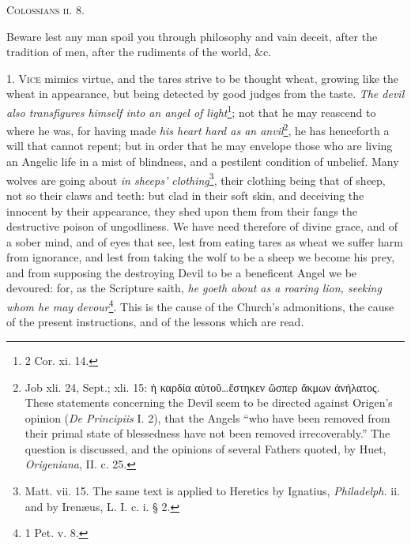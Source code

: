 \textsc{Colossians ii. 8}.

Beware lest any man spoil you through philosophy and vain deceit, after the tradition of men, after the rudiments of the world, \&c.

1. \textsc{Vice} mimics virtue, and the tares strive to be thought wheat, growing like the wheat in appearance, but being detected by good judges from the taste. \emph{The devil also transfigures himself into an angel of light}\footnote{2 Cor. xi. 14.}; not that he may reascend to where he was, for having made \emph{his heart hard as an anvil}\footnote{Job xli. 24, Sept.; xli. 15: \textgreek{ἡ καρδία αὐτοῦ…ἕστηκεν ὥσπερ ἄκμων ἀνήλατος}. These statements concerning the Devil seem to be directed against Origen’s opinion (\emph{De Principiis} I. 2), that the Angels “who have been removed from their primal state of blessedness have not been removed irrecoverably.” The question is discussed, and the opinions of several Fathers quoted, by Huet, \emph{Origeniana}, II. c. 25.}, he has henceforth a will that cannot repent; but in order that he may envelope those who are living an Angelic life in a mist of blindness, and a pestilent condition of unbelief. Many wolves are going about \emph{in sheeps’ clothing}\footnote{Matt. vii. 15. The same text is applied to Heretics by Ignatius, \emph{Philadelph.} ii. and by Irenæus, L. I. c. i. § 2.}, their clothing being that of sheep, not so their claws and teeth: but clad in their soft skin, and deceiving the innocent by their appearance, they shed upon them from their fangs the destructive poison of ungodliness. We have need therefore of divine grace, and of a sober mind, and of eyes that see, lest from eating tares as wheat we suffer harm from ignorance, and lest from taking the wolf to be a sheep we become his prey, and from supposing the destroying Devil to be a beneficent Angel we be devoured: for, as the Scripture saith, \emph{he goeth about as a roaring lion, seeking whom he may devour}\footnote{1 Pet. v. 8.}. This is the cause of the Church’s admonitions, the cause of the present instructions, and of the lessons which are read.


